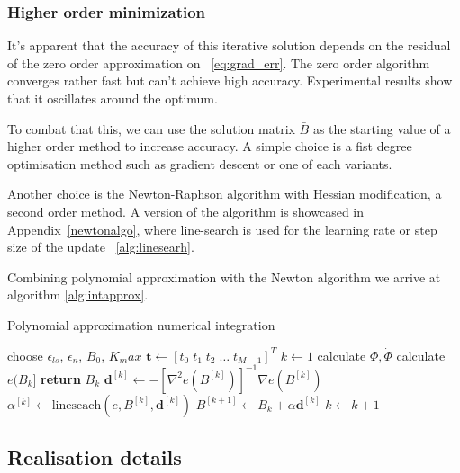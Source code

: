 \documentclass[11pt]{article}
\begin{document}
    \subsubsection{Higher order minimization}
    It's apparent that the accuracy of this iterative solution depends on the residual of the zero order
    approximation on ~\eqref{eq:grad_err}.
    The zero order algorithm converges rather fast but can't achieve high accuracy.
    Experimental results show that it oscillates around the optimum.

    To combat that this, we can use the solution matrix $\bar B$ as the starting value of a higher order method to
    increase accuracy.
    A simple choice is a fist degree optimisation method such as gradient descent or one of each variants.

    Another choice is the Newton-Raphson algorithm with Hessian modification, a second order method.
    A version of the algorithm is showcased in Appendix~\ref{newtonalgo}, where line-search is used for the learning
    rate or step size of the update ~\ref{alg:linesearh}.

    Combining polynomial approximation with the Newton algorithm we arrive at algorithm \ref{alg:intapprox}.

    \begin{algorithm}
        \caption{Polynomial approximation numerical integration}
        \begin{algorithmic}
            \State choose $\epsilon_{ls}$, $\epsilon_{n}$, $B_0$, $K_max$
            \State $\pmb{t} \gets [t_0 \; t_1 \; t_2 \; \dots \; t_{M-1} ]^T$
            \State $k \gets 1$
            \State calculate $\Phi, \dot\Phi$
            \Repeat
                \State calculate $e(B_k]$
                    \State \textbf{return} $B_k$
                \EndIf
                \State $ \pmb{d}^{[k]} \gets -\left[ \nabla^2 e(B^{[k]}) \right]^{-1} \nabla e(B^{[k]})$
                \State $ \alpha^{[k]} \gets \text{lineseach}(e, B^{[k]}, \pmb{d}^{[k]}) $
                \State $ B^{[k+1]} \gets B_k + \alpha \pmb{d}^{[k]}$
                \State $k \gets k+1$
            \label{alg:intapprox}
        \end{algorithmic}
    \end{algorithm}

    \subsection{Realisation details}
\end{document}
